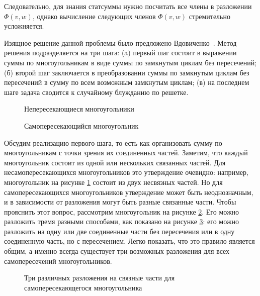 Следовательно, для знания статсуммы нужно посчитать все члены в разложении $\Phi(v, w)$, однако вычисление следующих членов $\Phi(v, w)$ стремительно усложняется. 

Изящное решение данной проблемы было предложено Вдовиченко~\cite{vdovichenko1965_1}. Метод решения подразделяется на три шага: (a) первый шаг состоит в выражении суммы по многоугольникам в виде суммы по замкнутым циклам без пересечений; (б) второй шаг заключается в преобразовании суммы по замкнутым циклам без пересечений в сумму по всем возможным замкнутым циклам; (в) на последнем шаге задача сводится к случайному блужданию по решетке.

 \begin{figure}[h]
 	\caption{Непересекающиеся многоугольники}
 	\label{noInterpolygons}
 \end{figure}   

 \begin{figure}[h]
 	\caption{Самопересекающийся многоугольник}
 	\label{selfpolygons}
 \end{figure}  

Обсудим реализацию первого шага, то есть как организовать сумму по многоугольникам с точки зрения их соединенных частей. Заметим, что каждый многоугольник состоит из одной или нескольких связанных частей. Для несамопересекающихся многоугольников это утверждение очевидно: например, многоугольник на рисунке \ref{noInterpolygons} состоит из двух несвязных частей. Но для самопересекающихся многоугольников утверждение может быть неоднозначным, и в зависимости от разложения могут быть разные связанные части. Чтобы прояснить этот вопрос, рассмотрим многоугольник на рисунке \ref{selfpolygons}. Его можно разложить тремя разными способами, как показано на рисунке \ref{threeVarPoly}: его можно разложить на одну или две соединенные части без пересечения или в одну соединенную часть, но с пересечением. Легко показать, что это правило является общим, а именно всегда существует три возможных разложения для всех самопересечений многоугольников. 

 \begin{figure}[h]
 	\caption{Три различных разложения на связные части для самопересекающегося многоугольника}
 	\label{threeVarPoly}
 \end{figure}

